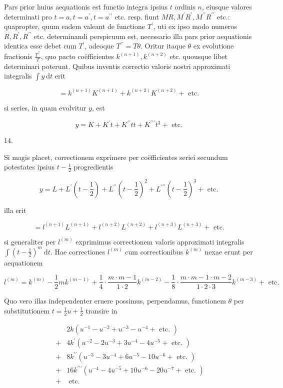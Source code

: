 \documentclass[10pt]{article}
\begin{document}
Pars prior huius aequationis est functio integra ipsius \(t\) ordinis \(n\), eiusque valores determinati pro \(t=a, t=a^{\prime}, t=a^{\prime \prime}\) etc. resp. fiunt \(M R, M^{\prime} R^{\prime}, M^{\prime \prime} R^{\prime \prime}\) etc.: quapropter, quum eadem valeant de functione \(T^{\prime}\), uti ex ipso modo numeros \(R, R^{\prime}, R^{\prime \prime}\) etc. determinandi perspicuum est, necessario illa pars prior aequationis identica esse debet cum \(T^{\prime}\), adeoque \(T^{\prime \prime}=T \theta\). Oritur itaque \(\theta\) ex evolutione fractionis \(\frac{T^{\prime \prime}}{T}\), quo pacto coëfficientes \(k^{(n+1)}, k^{(n+2)}\) etc. quousque libet determinari poterunt. Quibus inventis correctio valoris nostri approximati integralis \(\int y \mathrm{~d} t\) erit

\[
=k^{(n+1)} K^{(n+1)}+k^{(n+2)} K^{(n+2)}+\text { etc. }
\]

si series, in quam evolvitur \(y\), est

\[
y=K+K^{\prime} t+K^{\prime \prime} t t+K^{\prime \prime \prime} t^{3}+\text { etc. }
\]

14.

Si magis placet, correctionem exprimere per coëfficientes seriei secundum potestates ipsius \(t-\frac{1}{2}\) progredientis

\[
y=L+L^{\prime}\left(t-\frac{1}{2}\right)+L^{\prime \prime}\left(t-\frac{1}{2}\right)^{2}+L^{\prime \prime \prime}\left(t-\frac{1}{2}\right)^{3}+\text { etc. }
\]

illa erit

\[
=l^{(n+1)} L^{(n+1)}+l^{(n+2)} L^{(n+2)}+l^{(n+3)} L^{(n+3)}+\text { etc. }
\]

si generaliter per \(l^{(m)}\) exprimimus correctionem valoris approximati integralis \(\int\left(t-\frac{1}{2}\right)^{m} \mathrm{~d} t\). Hae correctiones \(l^{(m)}\) cum correctionibus \(k^{(m)}\) nexae erunt per aequationem

\[
l^{(m)}=k^{(m)}-\frac{1}{2} m k^{(m-1)}+\frac{1}{4} \cdot \frac{m \cdot m-1}{1 \cdot 2} k^{(m-2)}-\frac{1}{8} \cdot \frac{m \cdot m-1 \cdot m-2}{1 \cdot 2 \cdot 3} k^{(m-3)}+\text { etc. }
\]

Quo vero illas independenter eruere possimus, perpendamus, functionem \(\theta\) per substitutionem \(t=\frac{1}{2} u+\frac{1}{2}\) transire in

\[
\begin{aligned}
& 2 k\left(u^{-1}-u^{-2}+u^{-3}-u^{-4}+\text { etc. }\right) \\
+ & 4 k^{\prime}\left(u^{-2}-2 u^{-3}+3 u^{-4}-4 u^{-5}+\text { etc. }\right) \\
+ & 8 k^{\prime \prime}\left(u^{-3}-3 u^{-4}+6 u^{-5}-10 u^{-6}+\text { etc. }\right) \\
+ & 16 k^{\prime \prime \prime}\left(u^{-4}-4 u^{-5}+10 u^{-6}-20 u^{-7}+\text { etc. }\right) \\
+ & \text { etc. }
\end{aligned}
\]
\end{document}
